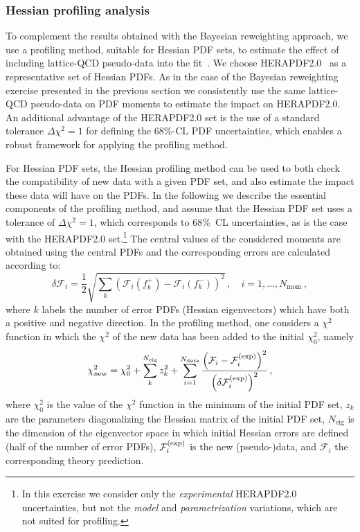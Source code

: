 \subsubsection{Hessian profiling analysis}
\label{sec:hessianprofiling}

To complement the results obtained
with the Bayesian reweighting approach,
we use a profiling method, suitable
for Hessian PDF sets, to estimate the effect of including
lattice-QCD pseudo-data into the fit~\cite{Paukkunen:2014zia,Camarda:2015zba}.
%
We choose HERAPDF2.0~\cite{Abramowicz:2015mha}
as a representative set of Hessian PDFs.
%
As in the case of the Bayesian reweighting
exercise presented in the previous section
we consistently use the same lattice-QCD
pseudo-data on PDF moments to estimate the impact on HERAPDF2.0.
%
An additional advantage of the HERAPDF2.0 set is
the use
of a standard tolerance
$\Delta\chi^2=1$ for defining the 68\%-CL PDF
uncertainties,
which enables a robust framework for applying the profiling method. 


For Hessian PDF sets, the Hessian profiling method
can be used to both check the compatibility of new data with a given PDF set,
and also  estimate the impact these data will have on the PDFs. 
In the following we describe the essential components of the profiling method, 
and assume  that the  Hessian PDF set uses a tolerance of $\Delta\chi^2=1$, 
which corresponds to 68\%~CL uncertainties,
as is the case with the HERAPDF2.0 set.\footnote{In this exercise
we consider only the {\it experimental} HERAPDF2.0
uncertainties, but not the {\it model} and {\it parametrization}
variations, which are not suited for profiling.}
%
The central values of the considered moments are obtained using the central PDFs and the corresponding
errors are calculated according to:
\begin{equation}
\delta\mathcal{F}_i = \frac{1}{2} \sqrt{\sum_{k}\left(\mathcal{F}_i(f_k^+)-\mathcal{F}_i(f_k^-)\right)^2}\, ,
\quad i=1,\ldots,N_\text{mom} \, ,
\end{equation}
where $k$ labels the number of error PDFs (Hessian eigenvectors)
which have both a positive and negative direction.
%
In the profiling method, one considers a $\chi^2$ function in which the $\chi^2$ of the new
data has been added to the initial $\chi^2_0$, namely
\begin{equation}
\label{eq:newchi2}
\chi^2_{\text{new}} = \chi_0^2 + \sum_{k}^{N_{\text{eig}}} z_k^2
                    + \sum_{i=1}^{N_{\text{data}}}
                      {{\left( \mathcal{F}_i - \mathcal{F}_i^{\rm(exp)}\right)^2}\over {\left(\delta\mathcal{F}_i^{\rm(exp)}\right)^2}}\,,
\end{equation}
where $\chi^2_0$ is the value of the $\chi^2$ function in the minimum of the initial PDF set,
$z_k$ are the parameters diagonalizing the Hessian matrix of the initial PDF set,
$N_{\text{eig}}$ is the dimension of the eigenvector space in which initial Hessian errors are defined
(half of the number of error PDFs), $\mathcal{F}_i^{\rm(exp)}$ is the new
\hbox{(pseudo-)data},
and $\mathcal{F}_i$ the corresponding theory prediction.

